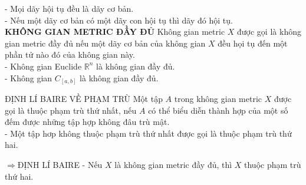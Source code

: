 \documentclass[12pt,a4paper]{article}
\begin{document}
    - Mọi dãy hội tụ đều là {\color{red}dãy cơ bản}.\\
    
    - Nếu một dãy cơ bản có một dãy con hội tụ thì dãy đó hội tụ.\\
    
    \hspace{0.0cm}\textbf{KHÔNG GIAN METRIC ĐẦY ĐỦ} Không gian metric $X$ được gọi là {\color{red}không gian metric đầy đủ} nếu một dãy cơ bản của không gian $X$ đều họi tụ đến một phần tử nào đó của không gian này.\\
    
    - Không gian {\color{red}Euclide $\mathds{R}^{n}$} là {\color{red}không gian đầy đủ}.\\
    
    - Không gian {\color{red}$C_{[a,b]}$} là {\color{red}không gian đầy đủ}. \\
    \item[ĐỊNH LÍ BAIRE VỀ PHẠM TRÙ] Một tập $A$ trong không gian metric $X$ được gọi là thuộc {\color{red}phạm trù thứ nhất}, nếu $A$ có thể biểu diễn thành hợp của một số đếm được những tập hợp không đâu trù mật.\\
    
    - Một tập hơp không thuộc phạm trù thứ nhất được gọi là thuộc {\color{red} phạm trù thứ hai}.\\
    
    \item[$\Longrightarrow$ĐỊNH LÍ BAIRE]- Nếu $X$ là không gian metric đầy đủ, thì $X$ thuộc phạm trù thứ hai.
\end{document}
